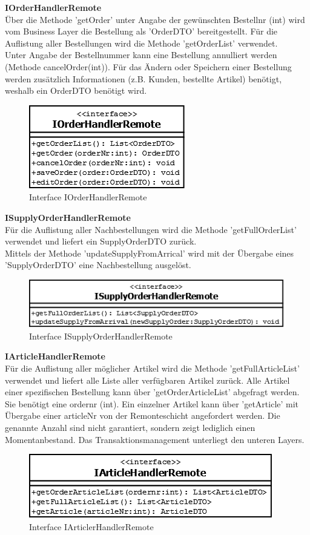 \textbf{IOrderHandlerRemote}\\
Über die Methode 'getOrder' unter Angabe der gewünschten Bestellnr (int) wird vom Business Layer die Bestellung als 'OrderDTO' bereitgestellt. Für die Auflistung aller Bestellungen wird die Methode 'getOrderList' verwendet.\\
Unter Angabe der Bestellnummer kann eine Bestellung annulliert werden (Methode cancelOrder(int)). Für das Ändern oder Speichern einer Bestellung werden zusätzlich Informationen (z.B. Kunden, bestellte Artikel) benötigt, weshalb ein OrderDTO benötigt wird.


\begin{figure}[H]
	\includegraphics[width=0.3\linewidth]{Images/IOrderHandlerRemonte}
	\caption{Interface IOrderHandlerRemote}
	\label{fig:if-IOrderHandlerRemote}
\end{figure}

\textbf{ISupplyOrderHandlerRemote}\\
Für die Auflistung aller Nachbestellungen wird die Methode 'getFullOrderList' verwendet und liefert ein SupplyOrderDTO zurück.\\
Mittels der Methode 'updateSupplyFromArrical' wird mit der Übergabe eines 'SupplyOrderDTO' eine Nachbestellung ausgelöst. 
\begin{figure}[H]
	\includegraphics[width=0.6\linewidth]{Images/ISupplyOrderHandlerRemonte}
	\caption{Interface ISupplyOrderHandlerRemote}
	\label{fig:if-ISupplyOrderHandlerRemote}
\end{figure}


\textbf{IArticleHandlerRemote}\\
Für die Auflistung aller möglicher Artikel wird die Methode 'getFullArticleList' verwendet und liefert alle Liste aller verfügbaren Artikel zurück. Alle Artikel einer spezifischen Bestellung kann über 'getOrderArticleList' abgefragt werden. Sie benötigt eine ordernr (int). Ein einzelner Artikel kann über 'getArticle' mit Übergabe einer articleNr von der Remonteschicht angefordert werden. Die genannte Anzahl sind nicht garantiert, sondern zeigt lediglich einen Momentanbestand. Das Transaktionsmanagement unterliegt den unteren Layers.
\begin{figure}[H]
	\includegraphics[width=0.6\linewidth]{Images/IArticleHandlerRemonte}
	\caption{Interface IArticlerHandlerRemote}
	\label{fig:if-IArticleHandlerRemote}
\end{figure}

